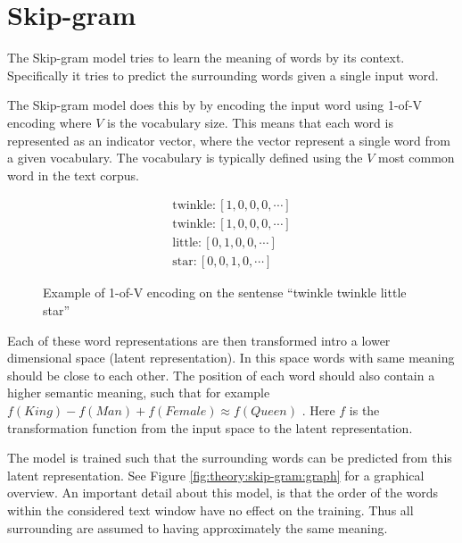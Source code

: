 
\section{Skip-gram}

The Skip-gram model tries to learn the meaning of words by its context. Specifically it tries to predict the surrounding words given a single input word.

The Skip-gram model does this by by encoding the input word using 1-of-V encoding where $V$ is the vocabulary size. This means that each word is represented as an indicator vector, where the vector represent a single word from a given vocabulary. The vocabulary is typically defined using the $V$ most common word in the text corpus. 
\begin{figure}[h]
\begin{equation*}
\begin{aligned}
\text{twinkle}: \left[1, 0, 0, 0, \cdots \right] \\
\text{twinkle}: \left[1, 0, 0, 0, \cdots \right] \\
\text{little}: \left[0, 1, 0, 0, \cdots \right] \\
\text{star}: \left[0, 0, 1, 0, \cdots \right]
\end{aligned}
\end{equation*}
\caption{Example of 1-of-V encoding on the sentense ``twinkle twinkle little star''}
\end{figure}

Each of these word representations are then transformed intro a lower dimensional space (latent representation). In this space words with same meaning should be close to each other. The position of each word should also contain a higher semantic meaning, such that for example $f(King) - f(Man) + f(Female) \approx f(Queen)$ \cite{word2vec-comparing}. Here $f$ is the transformation function from the input space to the latent representation.

The model is trained such that the surrounding words can be predicted from this latent representation. See Figure \ref{fig:theory:skip-gram:graph} for a graphical overview. An important detail about this model, is that the order of the words within the considered text window have no effect on the training. Thus all surrounding are assumed to having approximately the same meaning.

